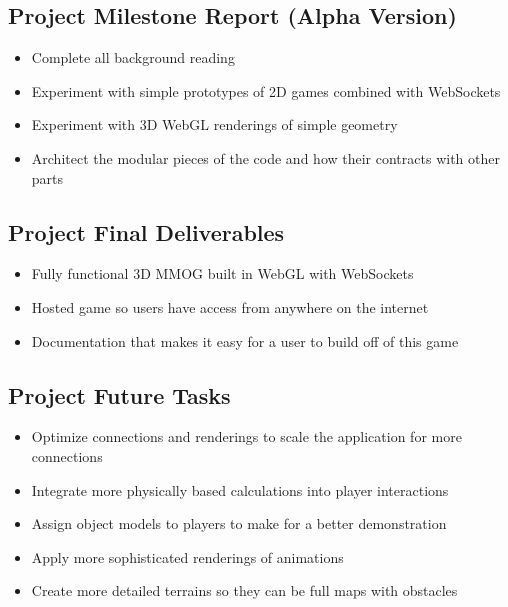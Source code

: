 \documentclass{acmsiggraph}
\begin{document}
    \subsection{Project Milestone Report (Alpha Version)}
    \begin{itemize}
        \item{Complete all background reading}
        \item{Experiment with simple prototypes of 2D games combined with WebSockets}
        \item{Experiment with 3D WebGL renderings of simple geometry}
        \item{Architect the modular pieces of the code and how their contracts with other parts}
    \end{itemize}

    \subsection{Project Final Deliverables}
    \begin{itemize}
        \item{Fully functional 3D MMOG built in WebGL with WebSockets}
        \item{Hosted game so users have access from anywhere on the internet}
        \item{Documentation that makes it easy for a user to build off of this game}
    \end{itemize}

    \subsection{Project Future Tasks}
    \begin{itemize}
        \item{Optimize connections and renderings to scale the application for more connections}
        \item{Integrate more physically based calculations into player interactions}
        \item{Assign object models to players to make for a better demonstration}
        \item{Apply more sophisticated renderings of animations}
        \item{Create more detailed terrains so they can be full maps with obstacles}
    \end{itemize}
\end{document}
